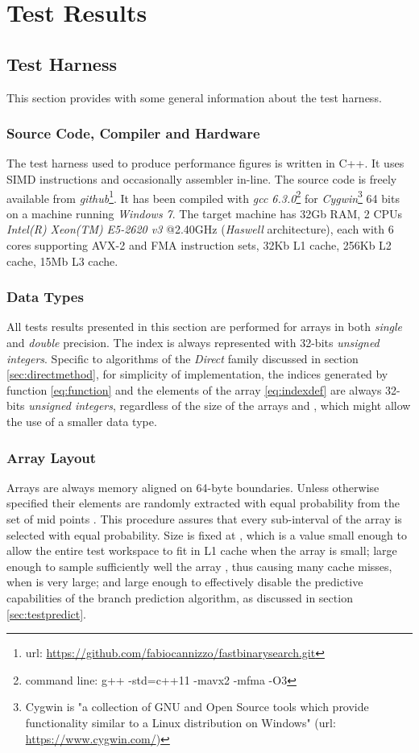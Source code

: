 \documentclass[preprint,1p,times]{elsarticle}
\begin{document}
\section{Test Results}
\label{sec:results}


\subsection{Test Harness}
This section provides with some general information about the test harness.

\subsubsection{Source Code, Compiler and Hardware}
The test harness used to produce performance figures is written in C++. It uses SIMD instructions and occasionally assembler in-line. The source code is freely available from \textit{github}\footnote{url: \url{https://github.com/fabiocannizzo/fastbinarysearch.git}}.
It has been compiled with \textit{gcc 6.3.0}\footnote{command line: g++ -std=c++11 -mavx2 -mfma -O3} for \textit{Cygwin}\footnote{Cygwin is "a collection of GNU and Open Source tools which provide functionality similar to a Linux distribution on Windows" (url: \url{https://www.cygwin.com/})} 64 bits on a machine running \textit{Windows 7}.
The target machine has 32Gb RAM, 2 CPUs \textit{Intel(R) Xeon(TM)} \textit{E5-2620 v3} @2.40GHz (\textit{Haswell} architecture), each with 6 cores supporting AVX-2 and FMA instruction sets, 32Kb L1 cache, 256Kb L2 cache, 15Mb L3 cache.

\subsubsection{Data Types}
All tests results presented in this section are performed for arrays  in both \textit{single} and \textit{double} precision. The index  is always represented with 32-bits \textit{unsigned integers}.
Specific to algorithms of the \textit{Direct} family discussed in section \ref{sec:directmethod}, for simplicity of implementation, the indices generated by function \eqref{eq:function} and the elements of the array \eqref{eq:indexdef}  are always 32-bits \textit{unsigned integers}, regardless of the size of the arrays  and , which might allow the use of a smaller data type.

\subsubsection{Array  Layout}
\label{sec:arrayz}
Arrays  are always memory aligned on 64-byte boundaries. Unless otherwise specified their elements are randomly extracted with equal probability from the set of mid points . This procedure assures that every sub-interval of the array  is selected with equal probability. Size is fixed at , which is a value small enough to allow the entire test workspace to fit in L1 cache when the array  is small; large enough to sample sufficiently well the array , thus causing many cache misses, when  is very large; and large enough to effectively disable the predictive capabilities of the branch prediction algorithm, as discussed in section \ref{sec:testpredict}.
\end{document}
